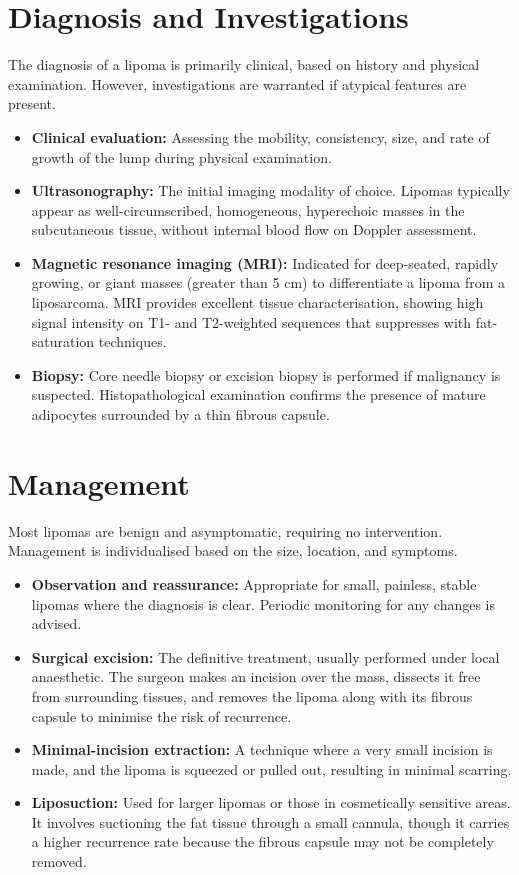 \section*{Diagnosis and Investigations}
The diagnosis of a lipoma is primarily clinical, based on history and physical examination. However, investigations are warranted if atypical features are present.

\begin{itemize}
    \item \textbf{Clinical evaluation:} Assessing the mobility, consistency, size, and rate of growth of the lump during physical examination.
    \item \textbf{Ultrasonography:} The initial imaging modality of choice. Lipomas typically appear as well-circumscribed, homogeneous, hyperechoic masses in the subcutaneous tissue, without internal blood flow on Doppler assessment.
    \item \textbf{Magnetic resonance imaging (MRI):} Indicated for deep-seated, rapidly growing, or giant masses (greater than 5 cm) to differentiate a lipoma from a liposarcoma. MRI provides excellent tissue characterisation, showing high signal intensity on T1- and T2-weighted sequences that suppresses with fat-saturation techniques.
    \item \textbf{Biopsy:} Core needle biopsy or excision biopsy is performed if malignancy is suspected. Histopathological examination confirms the presence of mature adipocytes surrounded by a thin fibrous capsule.
\end{itemize}

\section*{Management}
Most lipomas are benign and asymptomatic, requiring no intervention. Management is individualised based on the size, location, and symptoms.

\begin{itemize}
    \item \textbf{Observation and reassurance:} Appropriate for small, painless, stable lipomas where the diagnosis is clear. Periodic monitoring for any changes is advised.
    \item \textbf{Surgical excision:} The definitive treatment, usually performed under local anaesthetic. The surgeon makes an incision over the mass, dissects it free from surrounding tissues, and removes the lipoma along with its fibrous capsule to minimise the risk of recurrence.
    \item \textbf{Minimal-incision extraction:} A technique where a very small incision is made, and the lipoma is squeezed or pulled out, resulting in minimal scarring.
    \item \textbf{Liposuction:} Used for larger lipomas or those in cosmetically sensitive areas. It involves suctioning the fat tissue through a small cannula, though it carries a higher recurrence rate because the fibrous capsule may not be completely removed.
\end{itemize}

